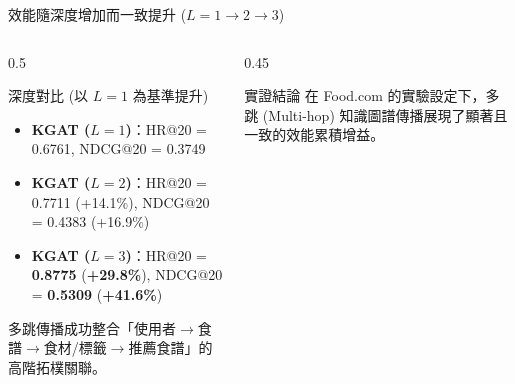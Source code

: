 \documentclass[aspectratio=169, 10pt]{beamer}
\begin{document}
\begin{frame}{效能隨深度增加而一致提升 ($L=1 \rightarrow 2 \rightarrow 3$)}
  \begin{columns}[T]
    \begin{column}{0.5\textwidth}
      \begin{block}{深度對比 (以 $L=1$ 為基準提升)}
        \begin{itemize}
          \item \textbf{KGAT ($L=1$)}：HR@20 = 0.6761, NDCG@20 = 0.3749
          \item \textbf{KGAT ($L=2$)}：HR@20 = 0.7711 (\textcolor{NTUBlueAccent}{+14.1\%}), NDCG@20 = 0.4383 (\textcolor{NTUBlueAccent}{+16.9\%})
          \item \textbf{KGAT ($L=3$)}：HR@20 = \textbf{0.8775} (\textcolor{HighlightRed}{\textbf{+29.8\%}}), NDCG@20 = \textbf{0.5309} (\textcolor{HighlightRed}{\textbf{+41.6\%}})
        \end{itemize}
      \end{block}
      \vspace{0.1cm}
      \small 多跳傳播成功整合「使用者$\rightarrow$食譜$\rightarrow$食材/標籤$\rightarrow$推薦食譜」的高階拓樸關聯。
    \end{column}
    
    \begin{column}{0.45\textwidth}
      \begin{exampleblock}{實證結論}
        在 Food.com 的實驗設定下，多跳 (Multi-hop) 知識圖譜傳播展現了顯著且一致的效能累積增益。
      \end{exampleblock}
    \end{column}
  \end{columns}
\end{frame}
\end{document}
